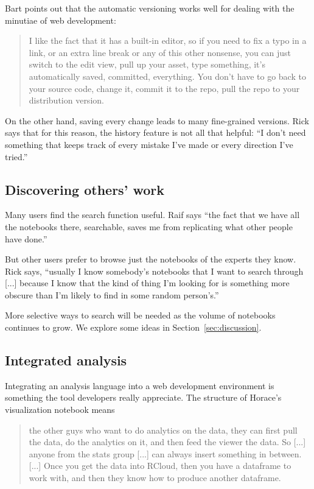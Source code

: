 
Bart points out that the automatic versioning works well for dealing with the
minutiae of web development:
\begin{quote}
I like the fact that it has a built-in editor, so
if you need to fix a typo in a link, or an extra line break or any of this other
nonsense, you can just switch to the edit view, pull up your asset, type
something, it's automatically saved, committed, everything. You don't have to go
back to your source code, change it, commit it to the repo, pull the repo to
your distribution version. 
\end{quote}

On the other hand, saving every change leads to many fine-grained
versions. Rick says that for this reason, the history feature is not all that
helpful: ``I don't need something that keeps track of every mistake I've made or
every direction I've tried.''


\subsection{Discovering others' work}
Many users find the search function useful. Raif says ``the fact that we have
all the notebooks there, searchable, saves me from replicating what other people
have done.''

But other users prefer to browse just the notebooks of the experts they
know. Rick says, ``usually I know somebody's notebooks that I want to search
through [...] because I know that the kind of thing I'm looking for is something
more obscure than I'm likely to find in some random person's.''

More selective ways to search will be needed as the volume of notebooks
continues to grow. We explore some ideas in Section~\ref{sec:discussion}.

\subsection{Integrated analysis}
Integrating an analysis language into a web development environment is something
the tool developers really appreciate.  The structure of Horace's visualization
notebook means
\begin{quote}
the other guys who want to do analytics on the data, they can first pull
the data, do the analytics on it, and then feed the viewer the data. So
[...] anyone from the stats group [...] can always insert something in
between. [...] Once you get the data into RCloud, then you have a
dataframe to work with, and then they know how to produce another
dataframe.
\end{quote}

